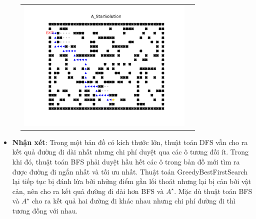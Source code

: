 \documentclass[11pt]{article} %
\begin{document}
\begin{itemize}
\begin{figure}[h]
\begin{tabular}{cc}
			\includegraphics[width=8.5cm]{Figures/fg5_astar.png}
		\end{tabular}
	\end{figure}
	\begin{itemize}
		\item \textbf{Nhận xét}: Trong một bản đồ có kích thước lớn, thuật toán DFS vẫn cho ra kết quả đường đi dài nhất nhưng chi phí duyệt qua các ô tương đối ít. Trong khi đó, thuật toán BFS phải duyệt hầu hết các ô trong bản đồ mới tìm ra được đường đi ngắn nhất và tối ưu nhất. Thuật toán GreedyBestFirstSearch lại tiếp tục bị đánh lừa bởi những điểm gần lối thoát nhưng lại bị cản bởi vật cản, nên cho ra kết quả đường đi dài hơn BFS và $A^{\star}$. Mặc dù thuật toán BFS và $A^{\star}$ cho ra kết quả hai đường đi khác nhau nhưng chi phí đường đi thì tương đồng với nhau.
	\end{itemize}
	\end{itemize}

\newpage
\end{document}
